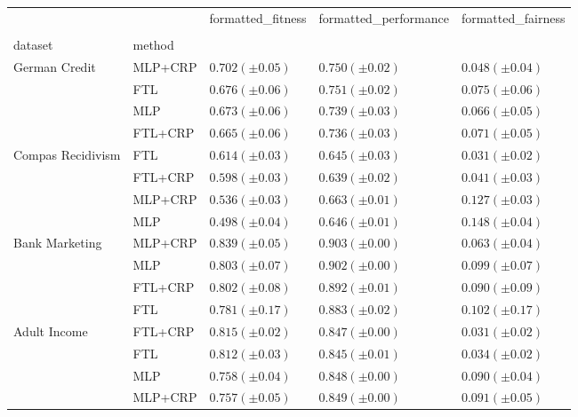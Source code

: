 \begin{tabular}{lllll}
\toprule
 &  & formatted_fitness & formatted_performance & formatted_fairness \\
 &  &  &  &  \\
dataset & method &  &  &  \\
\midrule
\multirow[t]{4}{*}{German Credit} & MLP+CRP & $0.702 (\pm0.05)$ & $0.750 (\pm0.02)$ & $0.048 (\pm0.04)$ \\
 & FTL & $0.676 (\pm0.06)$ & $0.751 (\pm0.02)$ & $0.075 (\pm0.06)$ \\
 & MLP & $0.673 (\pm0.06)$ & $0.739 (\pm0.03)$ & $0.066 (\pm0.05)$ \\
 & FTL+CRP & $0.665 (\pm0.06)$ & $0.736 (\pm0.03)$ & $0.071 (\pm0.05)$ \\
\cline{1-5}
\multirow[t]{4}{*}{Compas Recidivism} & FTL & $0.614 (\pm0.03)$ & $0.645 (\pm0.03)$ & $0.031 (\pm0.02)$ \\
 & FTL+CRP & $0.598 (\pm0.03)$ & $0.639 (\pm0.02)$ & $0.041 (\pm0.03)$ \\
 & MLP+CRP & $0.536 (\pm0.03)$ & $0.663 (\pm0.01)$ & $0.127 (\pm0.03)$ \\
 & MLP & $0.498 (\pm0.04)$ & $0.646 (\pm0.01)$ & $0.148 (\pm0.04)$ \\
\cline{1-5}
\multirow[t]{4}{*}{Bank Marketing} & MLP+CRP & $0.839 (\pm0.05)$ & $0.903 (\pm0.00)$ & $0.063 (\pm0.04)$ \\
 & MLP & $0.803 (\pm0.07)$ & $0.902 (\pm0.00)$ & $0.099 (\pm0.07)$ \\
 & FTL+CRP & $0.802 (\pm0.08)$ & $0.892 (\pm0.01)$ & $0.090 (\pm0.09)$ \\
 & FTL & $0.781 (\pm0.17)$ & $0.883 (\pm0.02)$ & $0.102 (\pm0.17)$ \\
\cline{1-5}
\multirow[t]{4}{*}{Adult Income} & FTL+CRP & $0.815 (\pm0.02)$ & $0.847 (\pm0.00)$ & $0.031 (\pm0.02)$ \\
 & FTL & $0.812 (\pm0.03)$ & $0.845 (\pm0.01)$ & $0.034 (\pm0.02)$ \\
 & MLP & $0.758 (\pm0.04)$ & $0.848 (\pm0.00)$ & $0.090 (\pm0.04)$ \\
 & MLP+CRP & $0.757 (\pm0.05)$ & $0.849 (\pm0.00)$ & $0.091 (\pm0.05)$ \\
\cline{1-5}
\bottomrule
\end{tabular}
